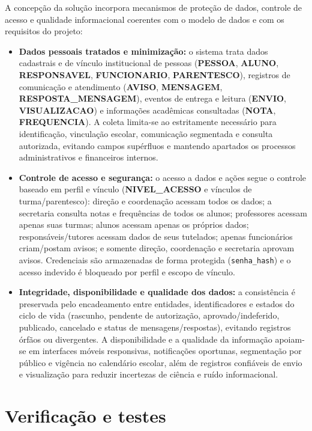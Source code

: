 \documentclass[a4paper,12pt]{report}
\begin{document}
A concepção da solução incorpora mecanismos de proteção de dados, controle de acesso e qualidade informacional coerentes com o modelo de dados e com os requisitos do projeto:

\begin{itemize}
    \item \textbf{Dados pessoais tratados e minimização:} o sistema trata dados cadastrais e de vínculo institucional de pessoas (\textbf{PESSOA}, \textbf{ALUNO}, \textbf{RESPONSAVEL}, \textbf{FUNCIONARIO}, \textbf{PARENTESCO}), registros de comunicação e atendimento (\textbf{AVISO}, \textbf{MENSAGEM}, \textbf{RESPOSTA\_MENSAGEM}), eventos de entrega e leitura (\textbf{ENVIO}, \textbf{VISUALIZACAO}) e informações acadêmicas consultadas (\textbf{NOTA}, \textbf{FREQUENCIA}). A coleta limita-se ao estritamente necessário para identificação, vinculação escolar, comunicação segmentada e consulta autorizada, evitando campos supérfluos e mantendo apartados os processos administrativos e financeiros internos.
    \item \textbf{Controle de acesso e segurança:} o acesso a dados e ações segue o controle baseado em perfil e vínculo (\textbf{NIVEL\_ACESSO} e vínculos de turma/parentesco): direção e coordenação acessam todos os dados; a secretaria consulta notas e frequências de todos os alunos; professores acessam apenas suas turmas; alunos acessam apenas os próprios dados; responsáveis/tutores acessam dados de seus tutelados; apenas funcionários criam/postam avisos; e somente direção, coordenação e secretaria aprovam avisos. Credenciais são armazenadas de forma protegida (\texttt{senha\_hash}) e o acesso indevido é bloqueado por perfil e escopo de vínculo.
    \item \textbf{Integridade, disponibilidade e qualidade dos dados:} a consistência é preservada pelo encadeamento entre entidades, identificadores e estados do ciclo de vida (rascunho, pendente de autorização, aprovado/indeferido, publicado, cancelado e status de mensagens/respostas), evitando registros órfãos ou divergentes. A disponibilidade e a qualidade da informação apoiam-se em interfaces móveis responsivas, notificações oportunas, segmentação por público e vigência no calendário escolar, além de registros confiáveis de envio e visualização para reduzir incertezas de ciência e ruído informacional.
\end{itemize}

\chapter{Verificação e testes}
\end{document}
